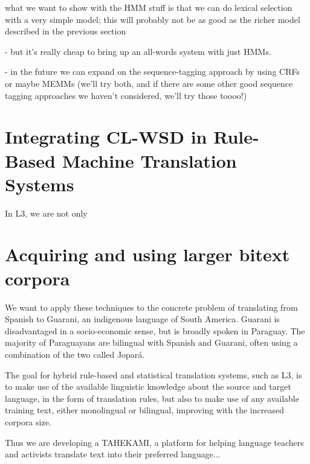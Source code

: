 \documentclass{article}
\begin{document}
what we want to show with the HMM stuff is that we can do lexical selection
with a very simple model; this will probably not be as good as the richer model
described in the previous section

- but it's really cheap to bring up an all-words system with just HMMs.

- in the future we can expand on the sequence-tagging approach by using CRFs or
  maybe MEMMs (we'll try both, and if there are some other good sequence
  tagging approaches we haven't considered, we'll try those toooo!)



\section{Integrating CL-WSD in Rule-Based Machine Translation Systems}
In L3, we are not only 

\cite{gasser:sxdg}

\cite{gasser:aflat2012}

\section{Acquiring and using larger bitext corpora}

We want to apply these techniques to the concrete problem of translating from
Spanish to Guarani, an indigenous language of South America. Guarani is
disadvantaged in a socio-economic sense, but is broadly spoken in Paraguay. The
majority of Paraguayans are bilingual with Spanish and Guarani, often using a
combination of the two called Jopar{\'a}.

The goal for hybrid rule-based and statistical translation systems, such as L3,
is to make use of the available linguistic knowledge about the source and
target language, in the form of translation rules, but also to make use of any
available training text, either monolingual or bilingual, improving with the
increased corpora size.

Thus we are developing a TAHEKAMI, a platform for helping language teachers and
activists translate text into their preferred language...


{}
\end{document}

